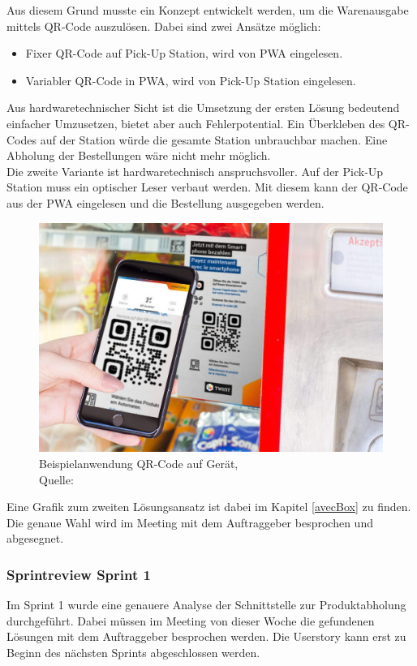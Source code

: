 Aus diesem Grund musste ein Konzept entwickelt werden, um die Warenausgabe mittels QR-Code auszulösen. Dabei sind zwei Ansätze möglich: 
\begin{itemize}
	\item Fixer QR-Code auf Pick-Up Station, wird von \ac{PWA} eingelesen. 
	\item Variabler QR-Code in \ac{PWA}, wird von Pick-Up Station eingelesen. 
\end{itemize}
Aus hardwaretechnischer Sicht ist die Umsetzung der ersten Lösung bedeutend einfacher Umzusetzen, bietet aber auch Fehlerpotential. Ein Überkleben des QR-Codes auf der Station würde die gesamte Station unbrauchbar machen. Eine Abholung der Bestellungen wäre nicht mehr möglich. \\
Die zweite Variante ist hardwaretechnisch anspruchsvoller. Auf der Pick-Up Station muss ein optischer Leser verbaut werden. Mit diesem kann der QR-Code aus der \ac{PWA} eingelesen und die Bestellung ausgegeben werden. \\

\begin{figure}[H]
	\centering
	\includegraphics[width=1\textwidth]{images/QR-CodeOnMachine.jpg}
	\caption[Beispielanwendung QR-Code auf Gerät]{Beispielanwendung QR-Code auf Gerät,\\ Quelle: \cite{imageQRCodeTwint}}
	\label{img: Beispielanwendung QR-Code auf Geraet}
\end{figure}
Eine Grafik zum zweiten Lösungsansatz ist dabei im Kapitel \ref{avecBox} zu finden. 
Die genaue Wahl wird im Meeting mit dem Auftraggeber besprochen und abgesegnet. 

\subsubsection{Sprintreview Sprint 1}
Im Sprint 1 wurde eine genauere Analyse der Schnittstelle zur Produktabholung durchgeführt. Dabei müssen im Meeting von dieser Woche die gefundenen Lösungen mit dem Auftraggeber besprochen werden. Die Userstory kann erst zu Beginn des nächsten Sprints abgeschlossen werden. 


